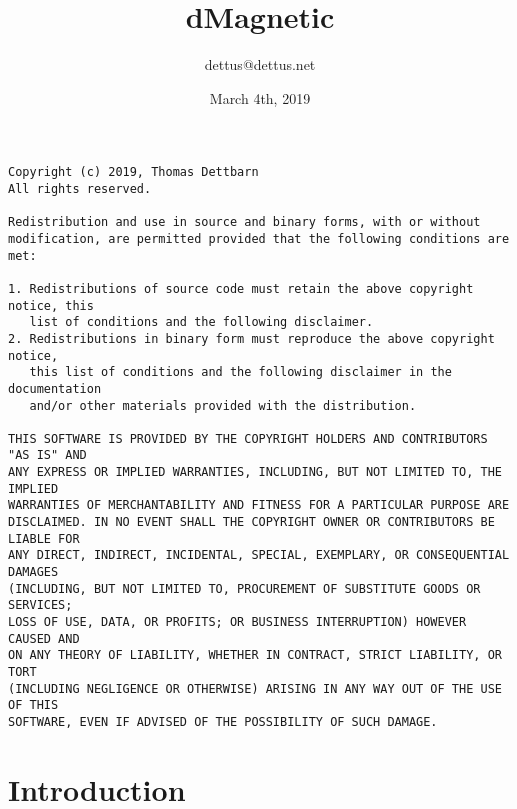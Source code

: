 \documentclass[11pt,twoside,openright]{report}
\begin{document}
\title{dMagnetic}
\author{dettus@dettus.net}
\date{March 4th, 2019}
\maketitle
{\tiny
\begin{verbatim}
Copyright (c) 2019, Thomas Dettbarn
All rights reserved.

Redistribution and use in source and binary forms, with or without
modification, are permitted provided that the following conditions are met:

1. Redistributions of source code must retain the above copyright notice, this
   list of conditions and the following disclaimer.
2. Redistributions in binary form must reproduce the above copyright notice,
   this list of conditions and the following disclaimer in the documentation
   and/or other materials provided with the distribution.

THIS SOFTWARE IS PROVIDED BY THE COPYRIGHT HOLDERS AND CONTRIBUTORS "AS IS" AND
ANY EXPRESS OR IMPLIED WARRANTIES, INCLUDING, BUT NOT LIMITED TO, THE IMPLIED
WARRANTIES OF MERCHANTABILITY AND FITNESS FOR A PARTICULAR PURPOSE ARE
DISCLAIMED. IN NO EVENT SHALL THE COPYRIGHT OWNER OR CONTRIBUTORS BE LIABLE FOR
ANY DIRECT, INDIRECT, INCIDENTAL, SPECIAL, EXEMPLARY, OR CONSEQUENTIAL DAMAGES
(INCLUDING, BUT NOT LIMITED TO, PROCUREMENT OF SUBSTITUTE GOODS OR SERVICES;
LOSS OF USE, DATA, OR PROFITS; OR BUSINESS INTERRUPTION) HOWEVER CAUSED AND
ON ANY THEORY OF LIABILITY, WHETHER IN CONTRACT, STRICT LIABILITY, OR TORT
(INCLUDING NEGLIGENCE OR OTHERWISE) ARISING IN ANY WAY OUT OF THE USE OF THIS
SOFTWARE, EVEN IF ADVISED OF THE POSSIBILITY OF SUCH DAMAGE.
\end{verbatim}
}
\tableofcontents
\newpage
\chapter{Introduction}
\end{document}
